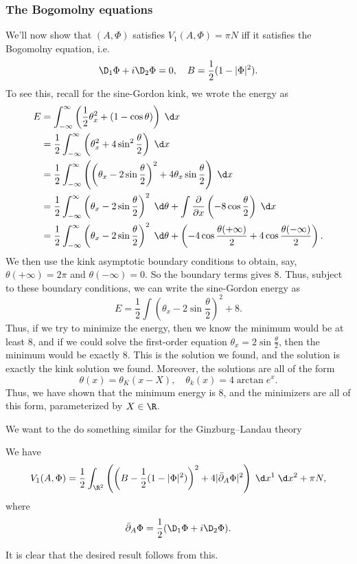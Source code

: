 \documentclass[a4paper]{article}
\begin{document}
\subsubsection*{The Bogomolny equations}
We'll now show that $(A, \Phi)$ satisfies $V_1(A, \Phi) = \pi N$ iff it satisfies the Bogomolny equation, i.e.
\[
  \D_1 \Phi + i \D_2 \Phi = 0,\quad B = \frac{1}{2} (1 - |\Phi|^2).
\]
To see this, recall for the sine-Gordon kink, we wrote the energy as
\begin{align*}
  E &= \int_{-\infty}^\infty \left(\frac{1}{2} \theta_x^2 + (1 - \cos \theta)\right) \;\d x \\
  &= \frac{1}{2} \int_{-\infty}^\infty \left(\theta_x^2 + 4 \sin^2 \frac{\theta}{2}\right) \;\d x\\
  &= \frac{1}{2} \int_{-\infty}^\infty \left(\left(\theta_x - 2 \sin \frac{\theta}{2}\right)^2 + 4 \theta_x \sin \frac{\theta}{2}\right)\;\d x\\
  &= \frac{1}{2} \int_{-\infty}^\infty \left(\theta_x - 2 \sin \frac{\theta}{2}\right)^2\;\d \theta + \int \frac{\partial}{\partial x}\left(-8 \cos \frac{\theta}{2}\right)\;\d x\\
  &= \frac{1}{2}\int_{-\infty}^\infty \left(\theta_x - 2 \sin \frac{\theta}{2}\right)^2\;\d \theta + \left(-4\cos \frac{\theta(+\infty)}{2} + 4 \cos \frac{\theta(-\infty)}{2}\right).
\end{align*}
We then use the kink asymptotic boundary conditions to obtain, say, $\theta(+\infty) = 2\pi$ and $\theta(-\infty) = 0$. So the boundary terms gives $8$. Thus, subject to these boundary conditions, we can write the sine-Gordon energy as
\[
  E = \frac{1}{2}\int \left(\theta_x - 2 \sin \frac{\theta}{2}\right)^2 + 8.
\]
Thus, if we try to minimize the energy, then we know the minimum would be at least $8$, and if we could solve the first-order equation $\theta_x = 2 \sin \frac{\theta}{2}$, then the minimum would be exactly $8$. This is the solution we found, and the solution is exactly the kink solution we found. Moreover, the solutions are all of the form
\[
  \theta(x) = \theta_K(x - X),\quad \theta_k(x) = 4 \arctan e^x.
\]
Thus, we have shown that the minimum energy is $8$, and the minimizers are all of this form, parameterized by $X \in \R$.

We want to the do something similar for the Ginzburg--Landau theory
\begin{lemma}
  We have
  \[
    V_1(A, \Phi) = \frac{1}{2} \int_{\R^2} \left(\left(B - \frac{1}{2}(1 - |\Phi|^2)\right)^2 + 4 |\bar{\partial}_A \Phi|^2\right)\;\d x^1\;\d x^2 + \pi N,
  \]
  where
  \[
    \bar{\partial}_A \Phi = \frac{1}{2} (\D_1 \Phi + i \D_2 \Phi).
  \]
\end{lemma}
It is clear that the desired result follows from this.
\end{document}
